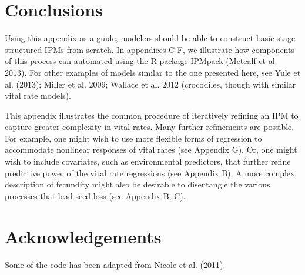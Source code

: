\documentclass[11pt]{article}
\begin{document}

\section{Conclusions}

Using this appendix as a guide, modelers should be able to construct basic stage structured IPMs from scratch. In appendices C-F, we illustrate how components of this process can automated using the R package IPMpack (Metcalf et al. 2013). For other examples of models  similar to the one presented here, see Yule et al. (2013); Miller et al. 2009; Wallace et al. 2012 (crocodiles, though with similar vital rate models). 

This appendix illustrates the common procedure of iteratively refining an IPM to capture greater complexity in vital rates. Many further refinements are possible. For example, one might wish to use more flexible forms of regression to accommodate nonlinear responses of vital rates (see Appendix G). Or, one might wish to include covariates, such as environmental predictors, that further refine predictive power of the vital rate regressions (see Appendix B). A more complex description of fecundity might also be desirable to disentangle the various processes that lead seed loss (see Appendix B; C).


\section{Acknowledgements}
Some of the code has been adapted from Nicole et al. (2011). 
\end{document}
